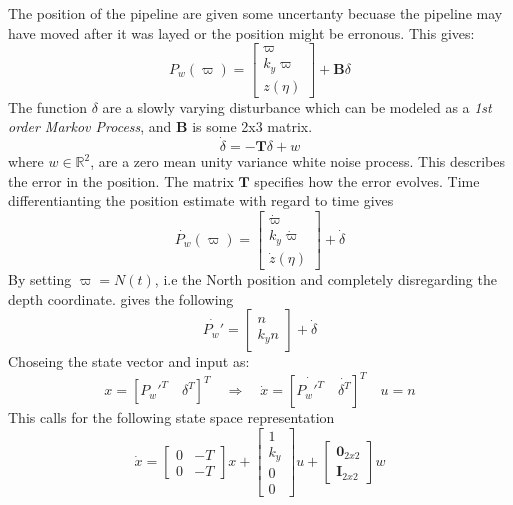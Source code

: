 	The position of the pipeline are given some uncertanty becuase the pipeline may have moved after it
	was layed or the position might be erronous. This gives:
	\begin{equation}
		P_w(\varpi) = \left [ \begin{array}{c}
					\varpi \\
					k_y \varpi \\
					z(\eta)
				\end{array} \right ] + \mathbf{B}\delta
	\end{equation}
	The function $\delta$ are a slowly varying disturbance which can be modeled as a \textit{1st order Markov
	Process}, and $\mathbf{B}$ is some 2x3 matrix.
	\begin{equation}
		\dot{\delta} = -\mathbf{T} \delta +  w
	\end{equation}
	where $w \in \mathbb{R}^2$, are a zero mean unity variance white noise process. This describes the
	error in the position. The matrix $\mathbf{T}$ specifies how the error evolves. Time differentianting
	the position estimate with regard to time gives
	\begin{equation}
		\dot{P_w}(\varpi) =  \left [ \begin{array}{c}
						\dot{\varpi} \\
						k_y \dot{\varpi} \\
						\dot{z}(\eta)
					\end{array} \right ] + \dot{\delta}
	\end{equation}
	By setting $\varpi = N(t)$, i.e the North position and completely disregarding the depth coordinate.
	gives the following
	\begin{equation}
		\dot{P_w'} = \left [ \begin{array}{c}
					n \\
					k_y n 
				\end{array} \right ] + \dot{\delta}
	\end{equation}
	Choseing the state vector and input as:
	\begin{equation}
		x = [ P_w'^T \quad \delta^T]^T \quad \Rightarrow  \quad \dot{x} = [\dot{P_w'^T} \quad
		\dot{\delta^T}]^T \quad  u = n
	\end{equation}
	This calls for the following state space representation 
	\begin{equation}
		\dot{x} = \left [ \begin{array}{cc}
					0 & -T \\
					0 & -T
				\end{array} \right] x + \left [ \begin{array}{c}
								1 \\
								k_y\\
								0 \\
								0
								\end{array} \right] u +
				\left [ \begin{array}{c}
						\mathbf{0}_{2x2} \\
						\mathbf{I}_{2x2} 
					\end{array} \right] w
	\end{equation}

